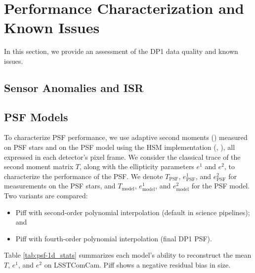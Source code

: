 \section{Performance Characterization and Known Issues
\label{sec:performance}}
%
In this section, we provide an assessment of the \gls{DP1} data quality and known issues.
%

\subsection{Sensor Anomalies and ISR}
\label{ssec:sensor_anomalies}



\subsection{PSF Models
\label{ssec:psf_models}}
To characterize \gls{PSF} performance, we use adaptive second moments (\citealt{2002AJ....123..583B}) measured on \gls{PSF} stars and on the PSF model using the \gls{HSM} implementation (\citealt{2003MNRAS.343..459H}, \citealt{2005MNRAS.361.1287M}), all expressed in each detector's pixel frame.
We consider the classical trace of the second moment matrix $T$, along with the ellipticity parameters $e^1$ and $e^2$, to characterize the performance of the PSF.
We denote $T_{\text{PSF}}$, $e^1_{\text{PSF}}$, and $e^2_{\text{PSF}}$ for
measurements on the \gls{PSF} stars, and $T_{\text{model}}$, $e^1_{\text{model}}$,
and $e^2_{\text{model}}$ for the \gls{PSF} model. Two variants are compared:
\begin{itemize}
\item Piff with second-order polynomial interpolation (default in science pipelines); and
\item Piff with fourth-order polynomial interpolation (final \gls{DP1} \gls{PSF}).
\end{itemize}

Table \ref{tab:psf-1d_stats} summarizes each model’s ability to reconstruct
the mean $T$, $e^1$, and $e^2$ on  \gls{LSSTComCam}. Piff shows a negative
residual bias in size.



